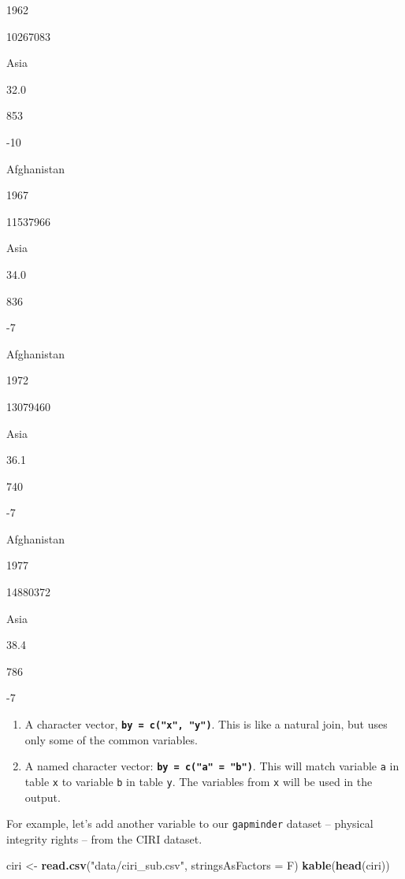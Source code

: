 \documentclass[]{book}
\newenvironment{Shaded}{\begin{snugshade}}{\end{snugshade}}
\newcommand{\KeywordTok}[1]{\textcolor[rgb]{0.13,0.29,0.53}{\textbf{#1}}}
\newcommand{\DataTypeTok}[1]{\textcolor[rgb]{0.13,0.29,0.53}{#1}}
\newcommand{\StringTok}[1]{\textcolor[rgb]{0.31,0.60,0.02}{#1}}
\newcommand{\NormalTok}[1]{#1}
\begin{document}
1962

10267083

Asia

32.0

853

-10

Afghanistan

1967

11537966

Asia

34.0

836

-7

Afghanistan

1972

13079460

Asia

36.1

740

-7

Afghanistan

1977

14880372

Asia

38.4

786

-7

\begin{enumerate}
\def\labelenumi{\arabic{enumi}.}
\setcounter{enumi}{1}
\item
  A character vector, \textbf{\texttt{by\ =\ c("x",\ "y")}}. This is
  like a natural join, but uses only some of the common variables.
\item
  A named character vector: \textbf{\texttt{by\ =\ c("a"\ =\ "b")}}.
  This will match variable \texttt{a} in table \texttt{x} to variable
  \texttt{b} in table \texttt{y}. The variables from \texttt{x} will be
  used in the output.
\end{enumerate}

For example, let's add another variable to our \texttt{gapminder}
dataset -- physical integrity rights -- from the CIRI dataset.

\begin{Shaded}
\begin{Highlighting}[]
\NormalTok{ciri <-}\StringTok{ }\KeywordTok{read.csv}\NormalTok{(}\StringTok{"data/ciri_sub.csv"}\NormalTok{, }\DataTypeTok{stringsAsFactors =}\NormalTok{ F)}
\KeywordTok{kable}\NormalTok{(}\KeywordTok{head}\NormalTok{(ciri))}
\end{Highlighting}
\end{Shaded}
\end{document}

